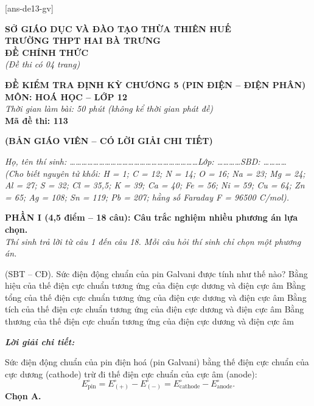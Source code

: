 \documentclass[11pt,a4paper]{article}
\def\loigiai#1{
\par\begingroup\color{blue!80!black}\small
\noindent\textbf{\textit{Lời giải chi tiết:}}\par
#1\par\endgroup}
\begin{document}
[ans-de13-gv]

\noindent
\begin{minipage}[t]{0.48\textwidth}
	\textbf{SỞ GIÁO DỤC VÀ ĐÀO TẠO THỪA THIÊN HUẾ}\\
	\textbf{TRƯỜNG THPT HAI BÀ TRƯNG}\\
	\textbf{ĐỀ CHÍNH THỨC}\\
	\textit{(Đề thi có 04 trang)}
\end{minipage}\hfill
\begin{minipage}[t]{0.48\textwidth}
	\raggedleft
	\textbf{\color{mainGreen}ĐỀ KIỂM TRA ĐỊNH KỲ CHƯƠNG 5 (PIN ĐIỆN – ĐIỆN PHÂN)}\\
	\textbf{MÔN: HOÁ HỌC -- LỚP 12}\\
	\textit{Thời gian làm bài: 50 phút (không kể thời gian phát đề)}\\
	\textbf{Mã đề thi: 113}
\end{minipage}


\vspace{0.1cm}
\begin{center}
	\textbf{\color{hfRed}\Large (BẢN GIÁO VIÊN -- CÓ LỜI GIẢI CHI TIẾT)}
\end{center}

\vspace{1pt}
\noindent\textit{Họ, tên thí sinh: \dots\dots\dots\dots\dots\dots\dots\dots\dots\dots\dots\dots\dots\dots\dots\dots\dots\dots\dots\dots\dots\dots Lớp: \dots\dots\dots\dots SBD: \dots\dots\dots\dots}\\
\noindent\textit{(Cho biết nguyên tử khối: H = 1; C = 12; N = 14; O = 16; Na = 23; Mg = 24; Al = 27; S = 32; Cl = 35,5; K = 39; Ca = 40; Fe = 56; Ni = 59; Cu = 64; Zn = 65; Ag = 108; Sn = 119; Pb = 207; hằng số Faraday F = 96500 C/mol).}

\vspace{2pt}
\noindent
\textbf{PHẦN I (4,5 điểm -- 18 câu): Câu trắc nghiệm nhiều phương án lựa chọn.}\\
\textit{Thí sinh trả lời từ câu 1 đến câu 18. Mỗi câu hỏi thí sinh chỉ chọn một phương án.}

\setcounter{ex}{0}

\begin{ex}
(SBT -- CĐ). Sức điện động chuẩn của pin Galvani được tính như thế nào?
\choice
{\True Bằng hiệu của thế điện cực chuẩn tương ứng của điện cực dương và điện cực âm}
{Bằng tổng của thế điện cực chuẩn tương ứng của điện cực dương và điện cực âm}
{Bằng tích của thế điện cực chuẩn tương ứng của điện cực dương và điện cực âm}
{Bằng thương của thế điện cực chuẩn tương ứng của điện cực dương và điện cực âm}
\loigiai{
Sức điện động chuẩn của pin điện hoá (pin Galvani) bằng thế điện cực chuẩn của cực dương (cathode) trừ đi thế điện cực chuẩn của cực âm (anode):
$$E^\circ_{\text{pin}} = E^\circ_{(+)} - E^\circ_{(-)} = E^\circ_{\text{cathode}} - E^\circ_{\text{anode}}.$$
\textbf{Chọn A.}}
\end{ex}
\end{document}
